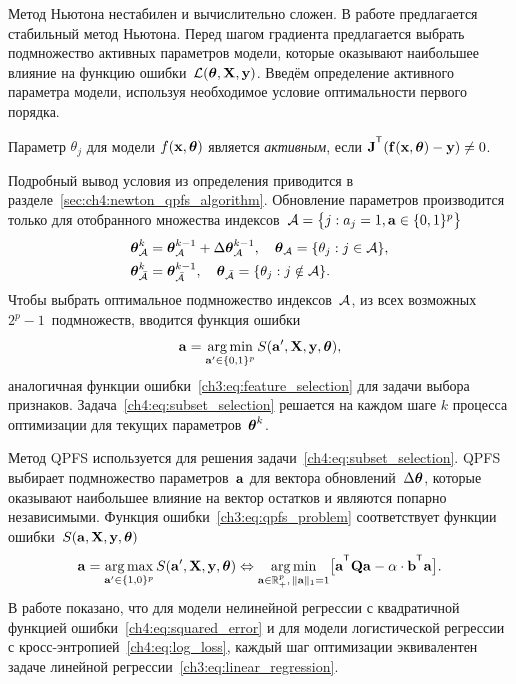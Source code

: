 Метод Ньютона нестабилен и вычислительно сложен. 
В работе предлагается стабильный метод Ньютона. 
Перед шагом градиента предлагается выбрать подмножество активных параметров модели, которые оказывают наибольшее влияние на функцию ошибки~$\mathcal{L} (\boldsymbol{\theta}, \mathbf{X}, \mathbf{y})$.
Введём определение активного параметра модели, используя необходимое условие оптимальности первого порядка.
\begin{definition}
	\label{ch4:def:active_param}
	Параметр $\theta_j$ для модели $f(\mathbf{x}, \boldsymbol{\theta})$ является \textit{активным}, если $\bJ^{\T} (\mathbf{f}(\bx, \btheta) - \by) \neq 0$.
\end{definition}
Подробный вывод условия из определения приводится в разделе~\ref{sec:ch4:newton_qpfs_algorithm}.
Обновление параметров производится только для отобранного множества индексов~$\mathcal{A} = \bigl\{j: a_j = 1, \mathbf{a} \in \{0, 1\}^p\bigr\}$
\begin{align*}
	\boldsymbol{\theta}_{\mathcal{A}}^k &= \boldsymbol{\theta}_{\mathcal{A}}^{k - 1} + \Delta \boldsymbol{\theta}_{\mathcal{A}}^{k - 1}, \quad \boldsymbol{\theta}_{\mathcal{A}} = \{\theta_j: j \in \mathcal{A} \}, \\
	\boldsymbol{\theta}_{\bar{\mathcal{A}}}^k &= \boldsymbol{\theta}_{\bar{\mathcal{A}}}^{k - 1}, \quad \boldsymbol{\theta}_{\bar{\mathcal{A}}} = \{\theta_j: j \notin \mathcal{A} \}.
\end{align*}
Чтобы выбрать оптимальное подмножество индексов~$\mathcal{A}$, из всех возможных $2^p - 1$~подмножеств, вводится функция ошибки
\begin{equation}
	\mathbf{a} = \mathop{\arg \min}\limits_{\mathbf{a}' \in \{0, 1\}^p} S(\mathbf{a}', \mathbf{X}, \mathbf{y}, \boldsymbol{\theta}),
	\label{ch4:eq:subset_selection}
\end{equation}
аналогичная функции ошибки~\eqref{ch3:eq:feature_selection} для задачи выбора признаков. 
Задача~\eqref{ch4:eq:subset_selection} решается на каждом шаге $k$ процесса оптимизации для текущих параметров~$\boldsymbol{\theta}^k$.

Метод QPFS используется для решения задачи~\eqref{ch4:eq:subset_selection}.
QPFS выбирает подмножество параметров~$\mathbf{a}$ для вектора обновлений~$ \Delta \boldsymbol{\theta}$, которые оказывают наибольшее влияние на вектор остатков и являются попарно независимыми.
Функция ошибки~\eqref{ch3:eq:qpfs_problem} соответствует функции ошибки~$S(\mathbf{a}, \mathbf{X}, \mathbf{y}, \boldsymbol{\theta})$
\begin{equation}
	\ba = \argmax_{\ba' \in \{1, 0\}^p} S(\ba', \bX, \by, \btheta) \Leftrightarrow \argmin_{\ba  \in \bbR^p_+, \, \|\ba\|_1=1} \bigl[\ba^{\T} \bQ \ba - \alpha \cdot \mathbf{b}^{\T} \ba \bigr].
\end{equation}
В работе показано, что для модели нелинейной регрессии с квадратичной функцией ошибки~\eqref{ch4:eq:squared_error} и для модели логистической регрессии с кросс-энтропией~\eqref{ch4:eq:log_loss}, каждый шаг оптимизации эквивалентен задаче линейной регрессии~\eqref{ch3:eq:linear_regression}.


